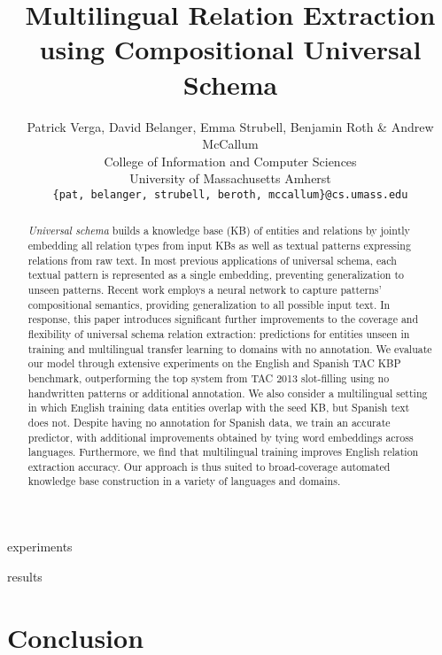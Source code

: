 \documentclass{article} %
\title{Multilingual Relation Extraction using Compositional Universal Schema}
\author{Patrick Verga, David Belanger, Emma Strubell, Benjamin Roth \& Andrew McCallum \\
College of Information and Computer Sciences\\
University of Massachusetts Amherst\\
\texttt{\{pat, belanger, strubell, beroth, mccallum\}@cs.umass.edu} \\
}
\begin{document}
\maketitle

\begin{abstract}
\emph{Universal schema} builds a knowledge base (KB) of entities and relations  by jointly embedding all relation types from input KBs as well as textual patterns expressing relations from raw text.
In most previous applications of universal schema, each textual pattern is represented as a single embedding, preventing generalization to unseen patterns. 
Recent work employs a neural network to capture patterns' compositional semantics, providing generalization to all possible input text.
In response, this paper introduces significant further improvements to the coverage and flexibility of universal schema relation extraction: predictions for entities unseen in training and multilingual transfer learning to domains with no annotation.
We evaluate our model through extensive experiments on the English and Spanish TAC KBP benchmark, outperforming the top system from TAC 2013 slot-filling using no handwritten patterns or additional annotation. 
We also consider a multilingual setting in which English training data entities overlap with the seed KB, but Spanish text does not. 
Despite having no annotation for Spanish data, we train an accurate predictor, with additional improvements obtained by tying word embeddings across languages. 
Furthermore, we find that multilingual training improves English relation extraction accuracy. 
Our approach is thus suited to broad-coverage automated knowledge base construction in a variety of languages and domains.
\end{abstract}





%
%



 {experiments}

 {results}


\section{Conclusion}
\end{document}
